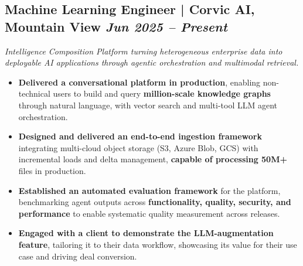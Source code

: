 \documentclass[10pt,a4paper]{article}
\begin{document}
\subsection{Machine Learning Engineer | Corvic AI, Mountain View \hfill
\textit{Jun 2025 -- Present}}
\textit{Intelligence Composition Platform turning heterogeneous enterprise data into deployable AI applications through agentic orchestration and multimodal retrieval.}
\begin{itemize}
    \item \textbf{Delivered a conversational platform in production}, enabling non-technical users to build and query \textbf{million-scale knowledge graphs} through natural language, with vector search and multi-tool LLM agent orchestration.
    \item \textbf{Designed and delivered an end-to-end ingestion framework} integrating multi-cloud object storage (S3, Azure Blob, GCS) with incremental loads and delta management, \textbf{capable of processing 50M+} files in production.
    \item \textbf{Established an automated evaluation framework} for the platform, benchmarking agent outputs across \textbf{functionality, quality, security, and performance} to enable systematic quality measurement across releases.
    \item \textbf{Engaged with a client to demonstrate the LLM-augmentation feature}, tailoring it to their data workflow, showcasing its value for their use case and driving deal conversion.

\end{itemize}
\vspace{0.3em}
\end{document}
